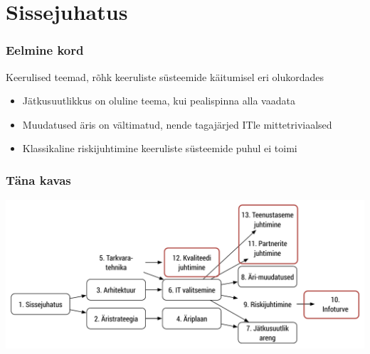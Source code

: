 

\maketitle

\section{Sissejuhatus}
\begin{frame}[fragile]
  \frametitle{Eelmine kord}
  Keerulised teemad, rõhk keeruliste süsteemide käitumisel eri olukordades
	\begin{itemize}
		\item Jätkusuutlikkus on oluline teema, kui pealispinna alla vaadata
		\item Muudatused äris on vältimatud, nende tagajärjed ITle mittetriviaalsed
		\item Klassikaline riskijuhtimine keeruliste süsteemide puhul ei toimi
	\end{itemize}
\end{frame}

\begin{frame}[fragile]
  \frametitle{Täna kavas}
		\includegraphics[width=\textwidth]{aine_struktuur_neljas.pdf}
\end{frame}

